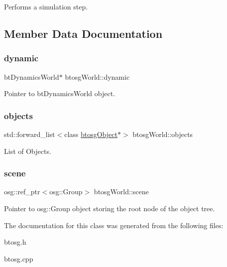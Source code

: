 Performs a simulation step. 

\subsection{Member Data Documentation}
\mbox{\label{classbtosgWorld_ad757a7b3b845142f200d1f2127e5372e}} 
\subsubsection{\texorpdfstring{dynamic}{dynamic}}
{\footnotesize\ttfamily bt\+Dynamics\+World$\ast$ btosg\+World\+::dynamic}

Pointer to bt\+Dynamics\+World object. \mbox{\label{classbtosgWorld_ab105aa8c0f8bdbdf323d47b902f6aca0}} 
\subsubsection{\texorpdfstring{objects}{objects}}
{\footnotesize\ttfamily std\+::forward\+\_\+list$<$class \hyperlink{classbtosgObject}{btosg\+Object}$\ast$$>$ btosg\+World\+::objects}



List of Objects. 

\mbox{\label{classbtosgWorld_ab6d438f54ccfc18955ea43e87731e008}} 
\subsubsection{\texorpdfstring{scene}{scene}}
{\footnotesize\ttfamily osg\+::ref\+\_\+ptr$<$osg\+::\+Group$>$ btosg\+World\+::scene}



Pointer to osg\+::\+Group object storing the root node of the object tree. 



The documentation for this class was generated from the following files\+:\begin{DoxyCompactItemize}
\item 
btosg.\+h\item 
btosg.\+cpp\end{DoxyCompactItemize}

